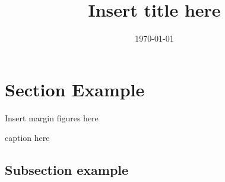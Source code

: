 \documentclass{tufte-handout}
\title{Insert title here}
\author{}
\date{\today}
\begin{document}
\maketitle

\vspace{0.1in}

\section{Section Example}

\begin{marginfigure}
Insert margin figures here
\caption{caption here}
\end{marginfigure}

\subsection{Subsection example}
\end{document}
